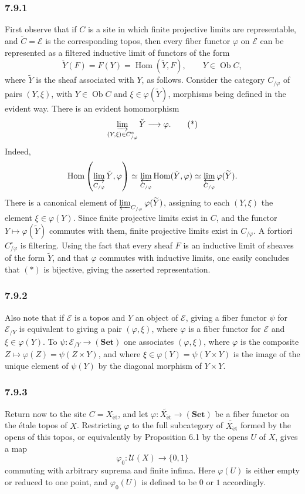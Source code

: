 \documentclass[11pt]{article}
\newcommand{\E}{\mathcal{E}}
\newcommand{\Hom}{\operatorname{Hom}}
\newcommand{\Ob}{\operatorname{Ob}}
\newcommand{\et}{\mathrm{\acute{e}t}}
\begin{document}
\subsubsection*{7.9.1}
First observe that if \(C\) is a site in which finite projective limits are representable, and \(\widetilde C=\E\) is the corresponding topos, then every fiber functor \(\varphi\) on \(\E\) can be represented as a filtered inductive limit of functors of the form
\[
\check Y(F)=F(Y)=\Hom(\widetilde Y,F),\qquad Y\in\Ob C,
\]
where \(\widetilde Y\) is the sheaf associated with \(Y\), as follows. Consider the category \(C_{/\varphi}\) of pairs \((Y,\xi)\), with \(Y\in\Ob C\) and \(\xi\in\varphi(\widetilde Y)\), morphisms being defined in the evident way. There is an evident homomorphism
\[
\varinjlim_{(Y,\xi)\in C_{/\varphi}^\circ}\check Y\longrightarrow\varphi.
\tag{*}
\]
Indeed,
\[
\Hom\left(\varinjlim_{C_{/\varphi}}\check Y,\varphi\right)
\simeq \varprojlim_{C_{/\varphi}}\Hom(\check Y,\varphi)
\simeq \varprojlim_{C_{/\varphi}}\varphi(\widetilde Y).
\]
There is a canonical element of \(\varprojlim_{C_{/\varphi}}\varphi(\widetilde Y)\), assigning to each \((Y,\xi)\) the element \(\xi\in\varphi(Y)\). Since finite projective limits exist in \(C\), and the functor \(Y\mapsto\varphi(\widetilde Y)\) commutes with them, finite projective limits exist in \(C_{/\varphi}\). A fortiori \(C_{/\varphi}^\circ\) is filtering. Using the fact that every sheaf \(F\) is an inductive limit of sheaves of the form \(\widetilde Y\), and that \(\varphi\) commutes with inductive limits, one easily concludes that \((*)\) is bijective, giving the asserted representation.

\subsubsection*{7.9.2}
Also note that if \(\E\) is a topos and \(Y\) an object of \(\E\), giving a fiber functor \(\psi\) for \(\E_{/Y}\) is equivalent to giving a pair \((\varphi,\xi)\), where \(\varphi\) is a fiber functor for \(\E\) and \(\xi\in\varphi(Y)\). To \(\psi:\E_{/Y}\to(\mathbf{Set})\) one associates \((\varphi,\xi)\), where \(\varphi\) is the composite \(Z\mapsto\varphi(Z)=\psi(Z\times Y)\), and where \(\xi\in\varphi(Y)=\psi(Y\times Y)\) is the image of the unique element of \(\psi(Y)\) by the diagonal morphism of \(Y\times Y\).

\subsubsection*{7.9.3}
Return now to the site \(C=X_{\et}\), and let \(\varphi:\widetilde{X_{\et}}\to(\mathbf{Set})\) be a fiber functor on the \'etale topos of \(X\). Restricting \(\varphi\) to the full subcategory of \(\widetilde{X_{\et}}\) formed by the opens of this topos, or equivalently by Proposition 6.1 by the opens \(U\) of \(X\), gives a map
\[
\varphi_0:\mathcal U(X)\longrightarrow\{0,1\}
\]
commuting with arbitrary suprema and finite infima. Here \(\varphi(U)\) is either empty or reduced to one point, and \(\varphi_0(U)\) is defined to be \(0\) or \(1\) accordingly.
\end{document}
